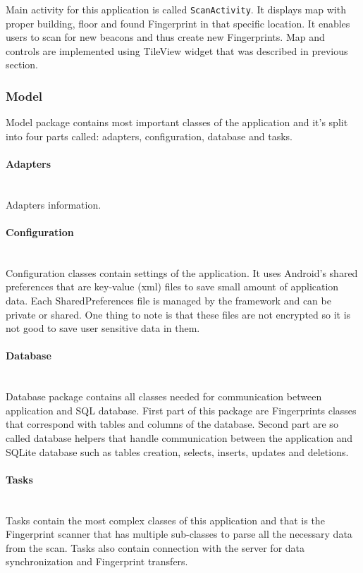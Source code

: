 Main activity for this application is called \verb|ScanActivity|. It displays map with proper building, floor and found Fingerprint in that specific location. It enables users to scan for new beacons and thus create new Fingerprints. Map and controls are implemented using TileView widget that was described in previous section. 

\subsubsection{Model}\label{subsec:Model}
Model package contains most important classes of the application and it's split into four parts called: adapters, configuration, database and tasks.

\paragraph{Adapters}\label{subsec:Adapters}\mbox{} \\
Adapters information. 

\paragraph{Configuration}\label{subsec:Configuration}\mbox{} \\
Configuration classes contain settings of the application. It uses Android's shared preferences that are key-value (xml) files to save small amount of application data. Each SharedPreferences file is managed by the framework and can be private or shared. One thing to note is that these files are not encrypted so it is not good to save user sensitive data in them.

\paragraph{Database}\label{subsec:Database}\mbox{} \\
Database package contains all classes needed for communication between application and SQL database. First part of this package are Fingerprints classes that correspond with tables and columns of the database. Second part are so called database helpers that handle communication between the application and SQLite database such as tables creation, selects, inserts, updates and deletions.

\paragraph{Tasks}\label{subsec:Tasks}\mbox{} \\
Tasks contain the most complex classes of this application and that is the Fingerprint scanner that has multiple sub-classes to parse all the necessary data from the scan. Tasks also contain connection with the server for data synchronization and Fingerprint transfers.

